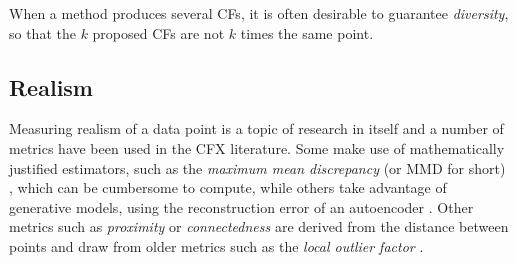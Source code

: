 \documentclass[../main.tex]{subfiles}
\begin{document}

When a method produces several CFs, it is often desirable to guarantee \emph{diversity}, so that the $k$ proposed CFs are not $k$ times the same point.

\subsection{Realism}

Measuring realism of a data point is a topic of research in itself and a number of metrics have been used in the CFX literature.
Some make use of mathematically justified estimators, such as the \emph{maximum mean discrepancy} (or MMD for short) \cite{zhangInterpretable2022}, which can be cumbersome to compute, while others take advantage of generative models, \eg{} using the reconstruction error of an autoencoder \cite{vanlooverenInterpretable2021}.
Other metrics such as \emph{proximity} or \emph{connectedness} \cite{laugelIssues2019} are derived from the distance between points and draw from older metrics such as the \emph{local outlier factor} \cite{breunigLOF2000}.
\end{document}
